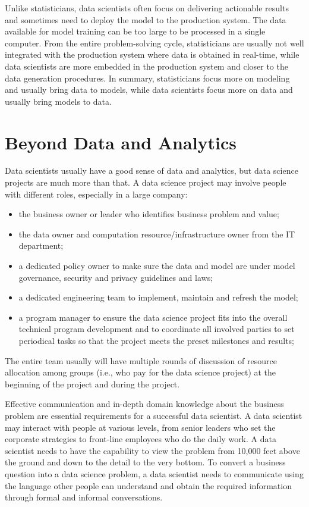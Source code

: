 \documentclass[12pt,]{krantz}
\providecommand{\tightlist}{%
  \setlength{\itemsep}{0pt}\setlength{\parskip}{0pt}}
\begin{document}
Unlike statisticians, data scientists often focus on delivering actionable results and sometimes need to deploy the model to the production system. The data available for model training can be too large to be processed in a single computer. From the entire problem-solving cycle, statisticians are usually not well integrated with the production system where data is obtained in real-time, while data scientists are more embedded in the production system and closer to the data generation procedures. In summary, statisticians focus more on modeling and usually bring data to models, while data scientists focus more on data and usually bring models to data.

\hypertarget{beyond-data-and-analytics}{%
\section{Beyond Data and Analytics}\label{beyond-data-and-analytics}}

Data scientists usually have a good sense of data and analytics, but data science projects are much more than that. A data science project may involve people with different roles, especially in a large company:

\begin{itemize}
\tightlist
\item
  the business owner or leader who identifies business problem and value;
\item
  the data owner and computation resource/infrastructure owner from the IT department;
\item
  a dedicated policy owner to make sure the data and model are under model governance, security and privacy guidelines and laws;
\item
  a dedicated engineering team to implement, maintain and refresh the model;
\item
  a program manager to ensure the data science project fits into the overall technical program development and to coordinate all involved parties to set periodical tasks so that the project meets the preset milestones and results;
\end{itemize}

The entire team usually will have multiple rounds of discussion of resource allocation among groups (i.e., who pay for the data science project) at the beginning of the project and during the project.

Effective communication and in-depth domain knowledge about the business problem are essential requirements for a successful data scientist. A data scientist may interact with people at various levels, from senior leaders who set the corporate strategies to front-line employees who do the daily work. A data scientist needs to have the capability to view the problem from 10,000 feet above the ground and down to the detail to the very bottom. To convert a business question into a data science problem, a data scientist needs to communicate using the language other people can understand and obtain the required information through formal and informal conversations.
\end{document}
